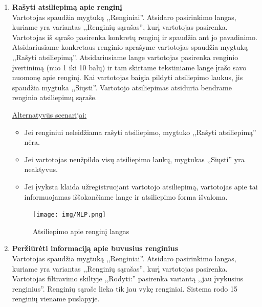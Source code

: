 \documentclass{VUMIFPSkursinis}
\begin{document}
\begin{enumerate} [label = \textbf{U\arabic*.}]
				\begin{figure}[H]
					\centering
					\texttt{[image: img/MLP.png]}
					\caption{Visų renginių tvarkaraščio langas}
					\label{fig:perziureti-renginiu-tvarkarasti}
				\end{figure}
				
			\item \textbf{Rašyti atsiliepimą apie renginį} \\
				Vartotojas spaudžia mygtuką ,,Renginiai''.
				Atsidaro pasirinkimo langas, kuriame yra variantas ,,Renginių sąrašas'', kurį vartotojas pasirenka.
				Vartotojas iš sąrašo pasirenka konkretų renginį ir spaudžia ant jo pavadinimo.
				Atsidariusiame konkretaus renginio aprašyme vartotojas spaudžia mygtuką ,,Rašyti atsiliepimą''.
				Atsidariusiame lange vartotojas pasirenka renginio įvertinimą (nuo 1 iki 10 balų) ir tam skirtame tekstiniame lange įrašo savo nuomonę apie renginį.
				Kai vartotojas baigia pildyti atsiliepimo laukus, jis spaudžia mygtuka ,,Siųsti''.
				Vartotojo atsiliepimas atsiduria bendrame renginio atsiliepimų sąraše.

				\underline{Alternatyvūs scenarijai:}
				\begin{itemize}
					\item Jei renginiui neleidžiama rašyti atsiliepimo, mygtuko ,,Rašyti atsiliepimą'' nėra.
					\item Jei vartotojas neužpildo visų atsiliepimo laukų, mygtukas ,,Siųsti'' yra neaktyvus.
					\item Jei įvyksta klaida užregistruojant vartotojo atsiliepimą, vartotojas apie tai informuojamas iššokančiame lange ir atsiliepimo forma išvaloma.
				\end{itemize}

				\begin{figure}[H]
					\centering
					\texttt{[image: img/MLP.png]}
					\caption{Atsiliepimo apie renginį langas}
					\label{fig:rasyti-atsiliepima-apie-rengini}
				\end{figure}
				
			\item \textbf{Peržiūrėti informaciją apie buvusius renginius} \\
				Vartotojas spaudžia mygtuką ,,Renginiai''.
				Atsidaro pasirinkimo langas, kuriame yra variantas ,,Renginių sąrašas'', kurį vartotojas pasirenka.
				Vartotojas filtravimo skiltyje ,,Rodyti:'' pasirenka variantą ,,jau įvykusius renginius''.
				Renginių sąraše lieka tik jau vykę renginiai.
				Sistema rodo 15 renginių viename puslapyje.


\end{enumerate}
\end{document}
